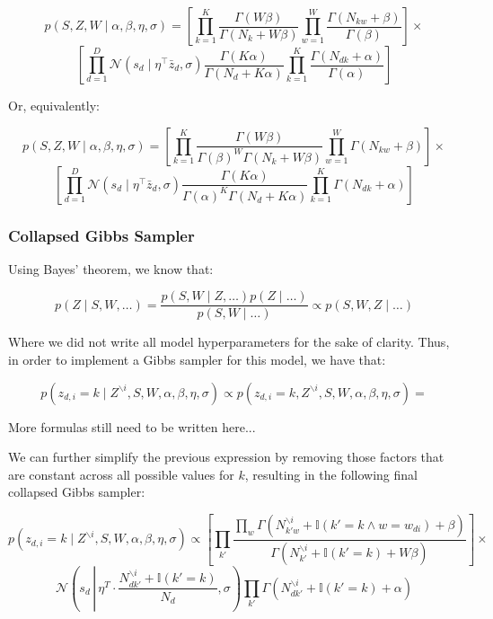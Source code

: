 \documentclass[a4paper,10pt]{article}
\begin{document}
\[ p(S, Z, W \mid \alpha, \beta, \eta, \sigma) = \left[ \prod_{k = 1}^K \frac{ \Gamma(W\beta)}{\Gamma(N_k + W\beta)} \prod_{w = 1}^W \frac{\Gamma(N_{kw}+\beta)}{\Gamma(\beta)}\right] \times \]
\begin{equation}
\left[ \prod_{d = 1}^D \mathcal{N}(s_d \mid \eta^\top \bar{z}_d, \sigma) \frac{\Gamma(K\alpha)}{\Gamma(N_d + K \alpha)} \prod_{k = 1}^K \frac{\Gamma(N_{dk} + \alpha)}{\Gamma(\alpha)} \right]
\end{equation}

Or, equivalently:

\[ p(S, Z, W \mid \alpha, \beta, \eta, \sigma) = \left[ \prod_{k = 1}^K \frac{ \Gamma(W\beta)}{\Gamma(\beta)^W \Gamma(N_k + W\beta)} \prod_{w = 1}^W \Gamma(N_{kw}+\beta)\right] \times \]
\begin{equation}
\left[ \prod_{d = 1}^D \mathcal{N}(s_d \mid \eta^\top \bar{z}_d, \sigma) \frac{\Gamma(K\alpha)}{\Gamma(\alpha)^K \Gamma(N_d + K \alpha)} \prod_{k = 1}^K \Gamma(N_{dk} + \alpha) \right]
\end{equation}

\subsubsection{Collapsed Gibbs Sampler}

Using Bayes' theorem, we know that:

\begin{equation}
p(Z \mid S, W, \dots) = \frac{p(S, W \mid Z, \dots) p(Z \mid \dots)}{p(S, W \mid \dots)} \propto p(S, W, Z \mid \dots)
\end{equation}

Where we did not write all model hyperparameters for the sake of clarity. Thus, in order to implement a Gibbs sampler for this model, we have that:

\[p(z_{d, i} = k \mid Z^{\backslash{i}}, S, W, \alpha, \beta, \eta, \sigma) \propto p(z_{d, i} = k, Z^{\backslash{i}}, S, W, \alpha, \beta, \eta, \sigma) = \]

More formulas still need to be written here... %

We can further simplify the previous expression by removing those factors that are constant across all possible values for $k$, resulting in the following final collapsed Gibbs sampler:

\[ p(z_{d, i} = k \mid Z^{\backslash{i}}, S, W, \alpha, \beta, \eta, \sigma) \propto \left[ \prod_{k'} \frac{\prod_w \Gamma(N_{{k'}w}^{\backslash i} + \mathbb{I}(k' = k \wedge w = w_{di}) + \beta)}{\Gamma(N_{k'}^{\backslash i} + \mathbb{I}(k' = k) + W \beta)} \right] \times \]
\begin{equation}
\mathcal{N}\left(s_d\, \left|\, \eta^T \cdot \frac{N_{d{k'}}^{\backslash i} + \mathbb{I}(k' = k)}{N_d}, \sigma\right. \right) \prod_{k'} \Gamma(N_{d{k'}}^{\backslash i} + \mathbb{I}(k' = k) + \alpha)
\end{equation}
\end{document}
